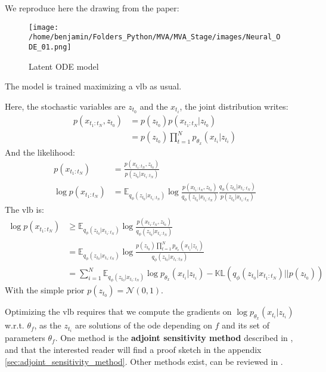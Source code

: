 We reproduce here the drawing from the paper:

\begin{figure}[H]
    \centering
    \texttt{[image: /home/benjamin/Folders\_Python/MVA/MVA\_Stage/images/Neural\_ODE\_01.png]}
    \caption{Latent ODE model}
    \label{fig:Latent ODE model}
\end{figure}

The model is trained maximizing a \gls{vlb} as usual. 

Here, the stochastic variables are $z_{t_0}$ and the $x_{t_i}$, the joint distribution writes:
\begin{align}
    p(x_{t_1:t_N}, z_{t_0}) &= p(z_{t_0})p(x_{t_1:t_N} \vert z_{t_0}) \\
    &= p(z_{t_0}) \prod_{t=1}^{N}p_{\theta_x}(x_{t_i} \vert z_{t_i})
\end{align}
And the likelihood:
\begin{align}
    p(x_{t_1:t_N}) &= \frac{p(x_{t_1:t_N}, z_{t_0})}{p(z_{t_0} \vert x_{t_1:t_N})} \\
    \log{p(x_{t_1:t_N})} &= \mathbb{E}_{q_{\phi}(z_{t_0} \vert x_{t_1:t_N})} \log{\frac{p(x_{t_1:t_N}, z_{t_0})}{q_{\phi}(z_{t_0}\vert x_{t_1:t_N})}\frac{q_{\phi}(z_{t_0}\vert x_{t_1:t_N})}{p(z_{t_0} \vert x_{t_1:t_N})}}
\end{align}
The \gls{vlb} is:
\begin{align}
    \log{p(x_{t_1:t_N})} &\geq \mathbb{E}_{q_{\phi}(z_{t_0} \vert x_{t_1:t_N})} \log{\frac{p(x_{t_1:t_N}, z_{t_0})}{q_{\phi}(z_{t_0}\vert x_{t_1:t_N})}} \\
    &= \mathbb{E}_{q_{\phi}(z_{t_0} \vert x_{t_1:t_N})} \log{\frac{p(z_{t_0}) \prod_{t=1}^{N}p_{\theta_x}(x_{t_i} \vert z_{t_i})}{q_{\phi}(z_{t_0}\vert x_{t_1:t_N})}} \\
    &= \sum_{i=1}^{N} \mathbb{E}_{q_{\phi}(z_{t_0} \vert x_{t_1:t_N})} \log{p_{\theta_x}(x_{t_i} \vert z_{t_i})} - \mathbb{KL}(q_{\phi}(z_{t_0} \vert x_{t_1:t_N}) \vert\vert p(z_{t_0}))
\end{align}
With the simple prior $p(z_{t_0}) = \mathcal{N}(0,1)$.

Optimizing the \gls{vlb} requires that we compute the gradients on $\log{p_{\theta_x}(x_{t_i} \vert z_{t_i})}$ w.r.t. $\theta_f$, as the $z_{t_i}$ are solutions of the \gls{ode} depending 
on $f$ and its set of parameters $\theta_f$. One method is the \textbf{adjoint sensitivity method} described in \cite{pontriagin_mathematical_2018}, 
and that the interested reader will find a proof sketch in the appendix \ref{sec:adjoint_sensitivity_method}. Other methods exist, can be reviewed in \cite{sengupta_efficient_2014}.


